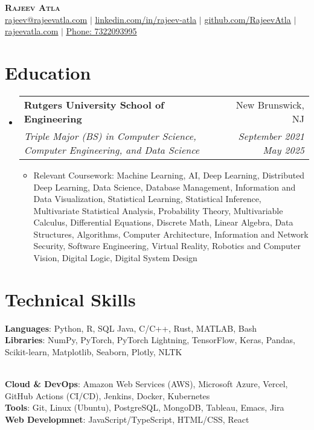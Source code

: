 \documentclass[letterpaper, 11pt]{article}
\makeatletter
\newcommand{\resumeSubheading}[4]{ %
  \vspace{-2pt}\item
    \begin{tabular*}{0.99\textwidth}[t]{l@{\extracolsep{\fill}}r}
      \textbf{#1} & #2 \\
      \textit{\small#3} & \textit{\small #4} \\
    \end{tabular*}\vspace{-7pt}
}
\newcommand{\resumeSubHeadingListStart}{\begin{itemize}[leftmargin=0.15in, label={}]}
\newcommand{\resumeSubHeadingListEnd}{\end{itemize}}
\makeatother
\begin{document}


\begin{center}
    \textbf{\Huge \scshape Rajeev Atla} \\
    \href{mailto:rajeev@rajeevatla.com}{\underline{rajeev@rajeevatla.com}} $|$ 
    \href{https://www.linkedin.com/in/rajeev-atla/}{\underline{linkedin.com/in/rajeev-atla}} $|$
    \href{https://github.com/RajeevAtla}{\underline{github.com/RajeevAtla}} $|$
    \href{https://rajeevatla.com}{\underline{rajeevatla.com}} $|$
    \href{tel:7322093995}{\underline{Phone: 7322093995}}
\end{center}


\section{Education}
  \resumeSubHeadingListStart{}
    \resumeSubheading %
      {Rutgers University \textendash{} School of Engineering}{New Brunswick, NJ}
      {Triple Major (BS) in Computer Science, Computer Engineering, and Data Science}{September 2021 \textendash{} May 2025}
      \begin{itemize}[leftmargin=0.25in, label={}]
      \item Relevant Coursework: Machine Learning, AI, Deep Learning, Distributed Deep Learning, Data Science, Database Management, Information and Data Visualization, Statistical Learning, Statistical Inference, Multivariate Statistical Analysis, Probability Theory, Multivariable Calculus, Differential Equations, Discrete Math, Linear Algebra, Data Structures, Algorithms, Computer Architecture, Information and Network Security, Software Engineering, Virtual Reality, Robotics and Computer Vision, Digital Logic, Digital System Design \\
\end{itemize}
  \resumeSubHeadingListEnd{}

\vspace{-35pt}

\section{Technical Skills}
 \begin{itemize}[leftmargin=0.25in, label={}]
    \small{\item{
     \textbf{Languages}{: Python, R, SQL Java, C/C++, Rust, MATLAB, Bash} \\
     \textbf{Libraries}{: NumPy, PyTorch, PyTorch Lightning, TensorFlow, Keras, Pandas, Scikit-learn, Matplotlib, Seaborn, Plotly, NLTK}
    }} \\
    \textbf{Cloud & DevOps}{: Amazon Web Services (AWS), Microsoft Azure, Vercel, GitHub Actions (CI/CD), Jenkins, Docker, Kubernetes} \\
     \textbf{Tools}{: Git, Linux (Ubuntu), PostgreSQL, MongoDB, Tableau, Emacs, Jira} \\
     \textbf{Web Developmnet}{: JavaScript/TypeScript, HTML/CSS, React} 
 \end{itemize}
\end{document}
